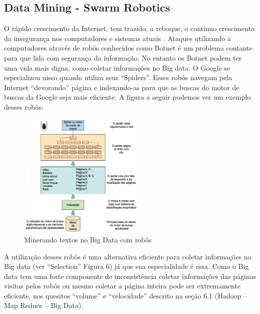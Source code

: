 \documentclass[conference,compsoc]{IEEEtran}
\begin{document}
\subsection{Data Mining - Swarm Robotics}\label{arte:palavraChave:Robotics}

O rápido crescimento da Internet, tem trazido, a reboque, o contínuo crescimento da insegurança nos computadores e sistemas atuais \cite{Barford2007}.
Ataques utilizando a computadores através de robôs conhecidos como Botnet é um problema contante para que lida com segurança da informação. No entanto os Botnet podem ter uma vida mais digna, como coletar informações no Big data. O Google se especializou nisso quando utiliza seus ``Spiders''. Esses robôs navegam pela Internet ``devorando'' página e indexando-as para que as buscas do motor de buscas da Google seja mais eficiente. A figura a seguir podemos ver um exemplo desses robôs: \cite{motorBusca}

\begin{figure}[!ht]
\centering
\caption{Minerando textos no Big Data com robôs}
\includegraphics[width=60mm, height=60mm]{Figuras/Motordebusca.png}
\end{figure}

A utilização desses robôs é uma alternativa eficiente para coletar informações no Big data (ver ``Selection'' Figura 6) já que sua especialidade é essa. Como o Big data tem uma forte componente de inconsistência coletar informações das páginas visitas pelos robôs ou mesmo coletar a página inteira pode ser extremamente eficiente, nos quesitos ``volume'' e ``velocidade'' descrito na seção 6.1 (Hadoop -- Map Reduce -- Big Data). 


\end{document}
